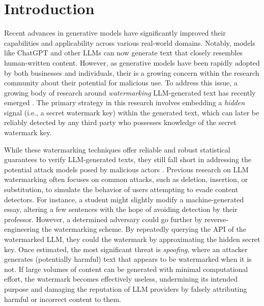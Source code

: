 \section{Introduction}
\label{sec:intro}
%
Recent advances in generative models have significantly improved their capabilities and applicability across various real-world domains. Notably, models like ChatGPT and other LLMs can now generate text that closely resembles human-written content. However, as generative models have been rapidly adopted by both businesses and individuals, their is a growing concern within the research community about their potential for malicious use. To address this issue, a growing body of research around \emph{watermarking} LLM-generated text has recently emerged \citep{kirchenbauer2023watermark, kuditipudi2024robust, aaronson2023openai, piet2024markwordsanalyzingevaluating, zhang2024remark, ning2024mcgmark}.  The primary strategy in this research involves embedding a \emph{hidden} signal (i.e., a secret watermark key) within the generated text, which can later be reliably detected by any third party who possesses knowledge of the secret watermark key.

While these watermarking techniques offer reliable and robust statistical guarantees to verify LLM-generated texts, they still fall short in addressing the potential attack models posed by malicious actors \cite{jovanovic2024watermarkstealinglargelanguage, zhang2024largelanguagemodelwatermark, pang2024attacking, wu2024bypassingllmwatermarkscoloraware, gloaguen2024black, gloaguen2024discovering}. Previous research on LLM watermarking often focuses on common attacks, such as deletion, insertion, or substitution, to simulate the behavior of users attempting to evade content detectors. For instance, a student might slightly modify a machine-generated essay, altering a few sentences with the hope of avoiding detection by their professor. However, a determined adversary could go further by reverse-engineering the watermarking scheme. By repeatedly querying the API of the watermarked LLM, they could  the watermark by approximating the hidden secret key. Once estimated, the most significant threat is \emph{spoofing}, where an attacker generates (potentially harmful) text that appears to be watermarked when it is not. If large volumes of   content can be generated with minimal computational effort, the watermark becomes effectively useless, undermining its intended purpose and damaging the reputation of LLM providers by falsely attributing harmful or incorrect content to them.

